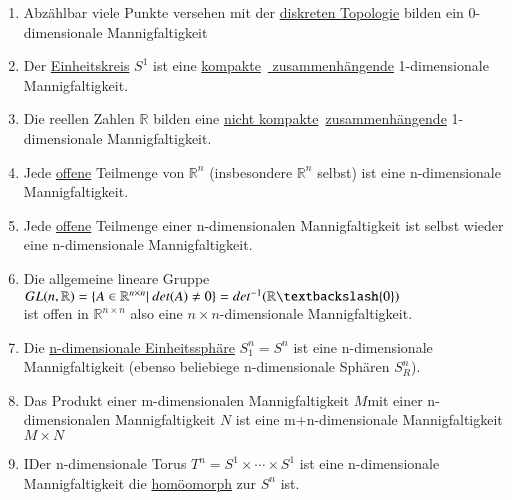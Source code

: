 \begin{rawDef}
\begin{enumerate}
	\item Abzählbar viele Punkte versehen mit der \hyperref[diskTopo]{diskreten Topologie} bilden ein 0-dimensionale Mannigfaltigkeit
	\item Der \hyperref[Einheitskreis]{Einheitskreis} $S^1$ ist eine \hyperref[kompakt]{kompakte}~\hyperref[zusammenhang]{ zusammenhängende} 1-dimensionale Mannigfaltigkeit.
	\item Die reellen Zahlen $\mathbb{R}$ bilden eine \hyperref[kompakt]{nicht kompakte}~\hyperref[zusammenhang]{zusammenhängende} 1-dimensionale Mannigfaltigkeit.
	\item Jede \hyperref[offen]{offene} Teilmenge von $\mathbb{R}^n$ (insbesondere $\mathbb{R}^n$ selbst) ist eine n-dimensionale Mannigfaltigkeit.
	\item Jede \hyperref[offen]{offene} Teilmenge einer n-dimensionalen Mannigfaltigkeit ist selbst wieder eine n-dimensionale Mannigfaltigkeit.
	\item Die allgemeine lineare Gruppe \\$GL(n,\mathbb{R})=\{A\in\mathbb{R}^{n\times n} |\ det(A)\neq0\}=det^{-1}(\mathbb{R}\textbackslash\{0\})$\\
	ist offen in $\mathbb{R}^{n\times n}$ also eine $n\times n$-dimensionale Mannigfaltigkeit.
	\item Die \hyperref[ndimsphere]{n-dimensionale Einheitssphäre} $S^n_1=S^n$ ist eine n-dimensionale Mannigfaltigkeit (ebenso beliebiege n-dimensionale Sphären $S^n_R$).
	\item Das Produkt einer m-dimensionalen Mannigfaltigkeit $M$mit einer n-dimensionalen Mannigfaltigkeit $N$ ist eine m+n-dimensionale Mannigfaltigkeit $M\times N$
	\item \begin{rawDef}
		\label{torus}
		IDer n-dimensionale Torus $T^n=S^1\times\cdots\times S^1$ ist eine n-dimensionale Mannigfaltigkeit die \hyperref[homoemorph]{homöomorph} zur $S^n$ ist.
	\end{rawDef}
\end{enumerate}
\end{rawDef}
